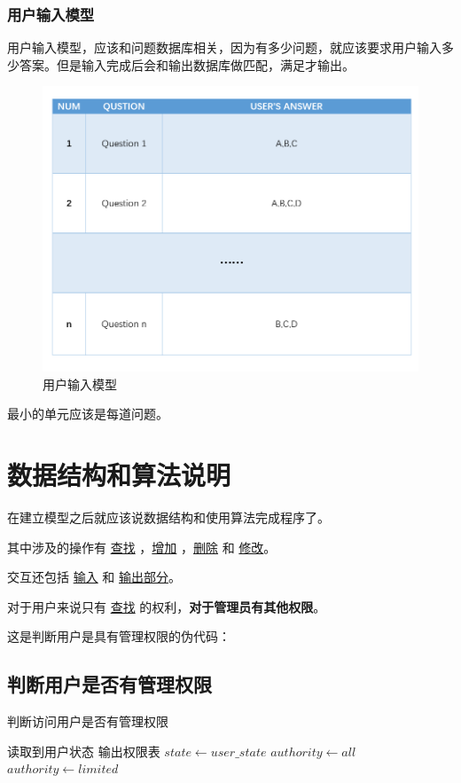 \documentclass[UTF8,18pt]{ctexart}
\begin{document}
{\subsubsection{用户输入模型}
用户输入模型，应该和问题数据库相关，因为有多少问题，就应该要求用户输入多少答案。但是输入完成后会和输出数据库做匹配，满足才输出。
\begin{figure}[H]
	\centering
	\includegraphics[scale=0.4]{ds3.png}
	\caption{用户输入模型}
	\label{fig:用户输入模型}

\end{figure}
最小的单元应该是每道问题。

\section{数据结构和算法说明}
在建立模型之后就应该说数据结构和使用算法完成程序了。

其中涉及的操作有 \underline{查找} ，\underline{增加} ，\underline{删除} 和 \underline{修改}。

交互还包括 \underline{输入} 和 \underline{输出部分}。

对于用户来说只有 \underline{查找} 的权利，\textbf{对于管理员有其他权限}。

这是判断用户是具有管理权限的伪代码：
\subsection{判断用户是否有管理权限}
\begin{algorithm}[H]
  \caption{判断访问用户是否有管理权限}
  \label{判断权限}
  \begin{algorithmic}
  \REQUIRE 读取到用户状态
  \ENSURE 输出权限表
  \STATE $state \gets user\_state$
  \STATE $authority \gets all$
  \ELSE
  \STATE $authority  \gets limited$
  \ENDIF
  \end{algorithmic}
\end{algorithm}
}
\end{document}
